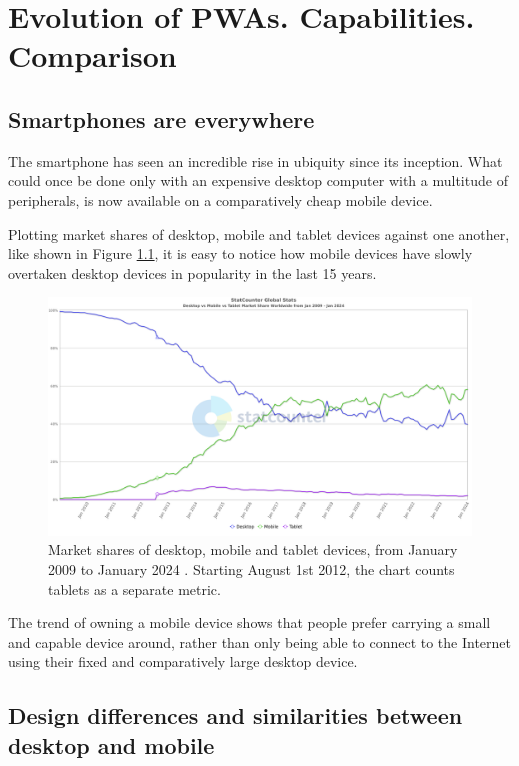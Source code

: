 \chapter{Evolution of PWAs. Capabilities. Comparison}

\section{Smartphones are everywhere}

The smartphone has seen an incredible rise in ubiquity since its inception. What could once be done only with an expensive desktop computer with a multitude of peripherals, is now available on a comparatively cheap mobile device.

Plotting market shares of desktop, mobile and tablet devices against one another, like shown in Figure \ref{FigStatCounterDMT}, it is easy to notice how mobile devices have slowly overtaken desktop devices in popularity in the last 15 years.

\begin{figure}[htbp]
    \centering
    \includegraphics[width=\textwidth]{./figures/ch2_desktop-vs-mobile.png}
    \caption{Market shares of desktop, mobile and tablet devices, from January 2009 to January 2024 \cite{StatCountDMT}. Starting August 1st 2012, the chart counts tablets as a separate metric.}
    \label{FigStatCounterDMT}
\end{figure}

The trend of owning a mobile device shows that people prefer carrying a small and capable device around, rather than only being able to connect to the Internet using their fixed and comparatively large desktop device.

\section{Design differences and similarities between desktop and mobile}

